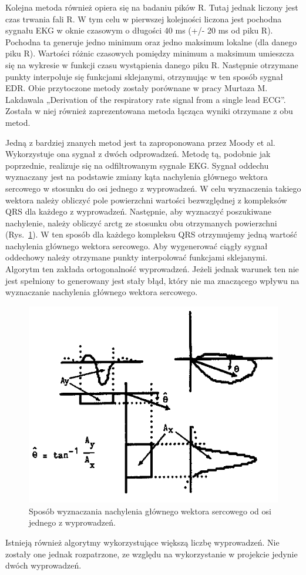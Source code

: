 	Kolejna metoda również opiera się na badaniu pików R. Tutaj jednak liczony jest czas trwania fali R. W tym celu w pierwszej kolejności liczona jest pochodna sygnału EKG w oknie czasowym o długości 40 ms (+/- 20 ms od piku R). Pochodna ta generuje jedno minimum oraz jedno maksimum lokalne (dla danego piku R). Wartości różnic czasowych pomiędzy minimum a maksimum umieszcza się na wykresie w funkcji czasu wystąpienia danego piku R. Następnie otrzymane punkty interpoluje się funkcjami sklejanymi, otrzymując w ten sposób sygnał EDR. Obie przytoczone metody zostały porównane w pracy Murtaza M. Lakdawala „Derivation of the respiratory rate signal from a single lead ECG”. Została w niej również zaprezentowana metoda łącząca wyniki otrzymane z obu metod.
	
	Jedną z bardziej znanych metod jest ta zaproponowana przez Moody et al. Wykorzystuje ona sygnał z dwóch odprowadzeń. Metodę tą, podobnie jak poprzednie, realizuje się na odfiltrowanym sygnale EKG. Sygnał oddechu wyznaczany jest na podstawie zmiany kąta nachylenia głównego wektora sercowego w stosunku do osi jednego z wyprowadzeń. W celu wyznaczenia takiego wektora należy obliczyć pole powierzchni wartości bezwzględnej z kompleksów QRS dla każdego z wyprowadzeń. Następnie, aby wyznaczyć poszukiwane nachylenie, należy obliczyć arctg ze stosunku obu otrzymanych powierzchni (Rys.~\ref{fig:moody_alg}). W ten sposób dla każdego kompleksu QRS otrzymujemy jedną wartość nachylenia głównego wektora sercowego. Aby wygenerować ciągły sygnał oddechowy należy otrzymane punkty interpolować funkcjami sklejanymi. Algorytm ten zakłada ortogonalność wyprowadzeń. Jeżeli jednak warunek ten nie jest spełniony to generowany jest stały błąd, który nie ma znaczącego wpływu na wyznaczanie nachylenia głównego wektora sercowego.
	
\begin{figure}[ht]
\centering
\includegraphics[width=12cm]{SIG_EDR/img/moody_alg.jpg}
\caption{Sposób wyznaczania nachylenia głównego wektora sercowego od osi jednego z wyprowadzeń.}
\label{fig:moody_alg}
\end{figure}
\newpage
	Istnieją również algorytmy wykorzystujące większą liczbę wyprowadzeń. Nie zostały one jednak rozpatrzone, ze względu na wykorzystanie w projekcie jedynie dwóch wyprowadzeń.
	

